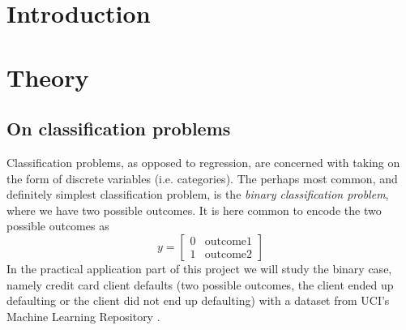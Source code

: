 \documentclass[10pt, a4paper, twocolumn]{article}
\begin{document}

\twocolumn[
  \begin{@twocolumnfalse}
    \maketitle
    \begin{abstract}
      \abstractText
      \newline
      \newline
    \end{abstract}
  \end{@twocolumnfalse}
]



\section{Introduction}
\section{Theory}
	\subsection{On classification problems}
		Classification problems, as opposed to regression, are concerned with taking on the form of discrete variables (i.e. categories). The perhaps most common, and definitely simplest classification problem, is the \emph{binary classification problem}, where we have two possible outcomes. It is here common to encode the two possible outcomes as
			$$ y = \begin{bmatrix} 0 &\mathrm{outcome 1} \\ 1 & \mathrm{outcome 2} \end{bmatrix} $$
		In the practical application part of this project we will study the binary case, namely credit card client defaults (two possible outcomes, the client ended up defaulting or the client did not end up defaulting) with a dataset from UCI's Machine Learning Repository \cite{UCImlRepoCCdata}. \\\\
		
\end{document}
